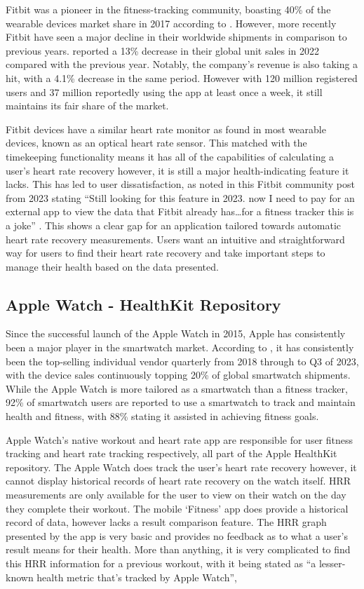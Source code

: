 \documentclass{l4proj}
\begin{document}
Fitbit was a pioneer in the fitness-tracking community, boasting 40\% of the wearable devices market share in 2017 according to \cite{MarketShare2023}. However, more recently Fitbit have seen a major decline in their worldwide shipments in comparison to previous years. \cite{Fitbit2024} reported a 13\% decrease in their global unit sales in 2022 compared with the previous year. Notably, the company’s revenue is also taking a hit, with a 4.1\% decrease in the same period. However with 120 million registered users and 37 million reportedly using the app at least once a week, it still maintains its fair share of the market.

Fitbit devices have a similar heart rate monitor as found in most wearable devices, known as an optical heart rate sensor. This matched with the timekeeping functionality means it has all of the capabilities of calculating a user’s heart rate recovery however, it is still a major health-indicating feature it lacks. This has led to user dissatisfaction, as noted in this Fitbit community post from 2023 stating “Still looking for this feature in 2023. now I need to pay for an external app to view the data that Fitbit already has…for a fitness tracker this is a joke” \cite{FitbitReview}. This shows a clear gap for an application tailored towards automatic heart rate recovery measurements. Users want an intuitive and straightforward way for users to find their heart rate recovery and take important steps to manage their health based on the data presented.

\subsection{Apple Watch - HealthKit Repository}
\label{sec:applewatch}

Since the successful launch of the Apple Watch in 2015, Apple has consistently been a major player in the smartwatch market. According to \cite{MarketShare2024}, it has consistently been the top-selling individual vendor quarterly from 2018 through to Q3 of 2023, with the device sales continuously topping 20\% of global smartwatch shipments. While the Apple Watch is more tailored as a smartwatch than a fitness tracker, 92\% of smartwatch users are reported to use a smartwatch to track and maintain health and fitness, with 88\% stating it assisted in achieving fitness goals.

Apple Watch’s native workout and heart rate app are responsible for user fitness tracking and heart rate tracking respectively, all part of the Apple HealthKit repository. The Apple Watch does track the user’s heart rate recovery however, it cannot display historical records of heart rate recovery on the watch itself. HRR measurements are only available for the user to view on their watch on the day they complete their workout. The mobile ‘Fitness’ app does provide a historical record of data, however lacks a result comparison feature. The HRR graph presented by the app is very basic and provides no feedback as to what a user’s result means for their health. More than anything, it is very complicated to find this HRR information for a previous workout, with it being stated as “a lesser-known health metric that’s tracked by Apple Watch”, \cite{AppleHRR}
\end{document}

